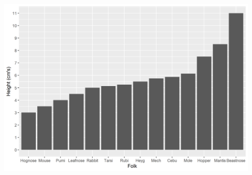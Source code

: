 \documentclass[twoside, 12pt, letterpaper]{report}\usepackage[]{graphicx}\usepackage[]{color}
\begin{document}
\begin{center}
\includegraphics{PC_heights_chart.png}
\end{center}
\end{document}
